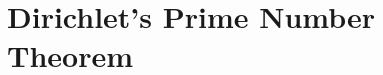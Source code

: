 \documentclass[elemannt.tex]{subfile}
\begin{document}
	\chapter{Dirichlet's Prime Number Theorem}
\end{document}
